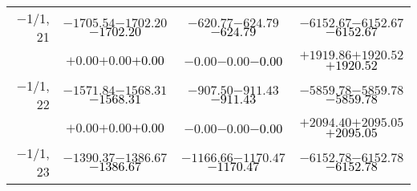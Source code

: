 \documentclass[compress]{beamer}
\begin{document}
\begin{frame}
{\begin{tabular}{r | c | c | c}
$-$1/1, 21 & $-1705.54$\hspace{0.1 cm}$-1702.20$\hspace{0.1 cm}\textcolor{black}{$-1702.20$} & $-620.77$\hspace{0.1 cm}$-624.79$\hspace{0.1 cm}\textcolor{black}{$-624.79$} & $-6152.67$\hspace{0.1 cm}$-6152.67$\hspace{0.1 cm}\textcolor{black}{$-6152.67$} \\
           & $+0.00$\hspace{0.1 cm}$+0.00$\hspace{0.1 cm}\textcolor{black}{$+0.00$} & $-0.00$\hspace{0.1 cm}$-0.00$\hspace{0.1 cm}\textcolor{black}{$-0.00$} & $+1919.86$\hspace{0.1 cm}$+1920.52$\hspace{0.1 cm}\textcolor{black}{$+1920.52$} \\
$-$1/1, 22 & $-1571.84$\hspace{0.1 cm}$-1568.31$\hspace{0.1 cm}\textcolor{black}{$-1568.31$} & $-907.50$\hspace{0.1 cm}$-911.43$\hspace{0.1 cm}\textcolor{black}{$-911.43$} & $-5859.78$\hspace{0.1 cm}$-5859.78$\hspace{0.1 cm}\textcolor{black}{$-5859.78$} \\
           & $+0.00$\hspace{0.1 cm}$+0.00$\hspace{0.1 cm}\textcolor{black}{$+0.00$} & $-0.00$\hspace{0.1 cm}$-0.00$\hspace{0.1 cm}\textcolor{black}{$-0.00$} & $+2094.40$\hspace{0.1 cm}$+2095.05$\hspace{0.1 cm}\textcolor{black}{$+2095.05$} \\
$-$1/1, 23 & $-1390.37$\hspace{0.1 cm}$-1386.67$\hspace{0.1 cm}\textcolor{black}{$-1386.67$} & $-1166.66$\hspace{0.1 cm}$-1170.47$\hspace{0.1 cm}\textcolor{black}{$-1170.47$} & $-6152.78$\hspace{0.1 cm}$-6152.78$\hspace{0.1 cm}\textcolor{black}{$-6152.78$} \\

\end{tabular}}
\end{frame}
\end{document}
